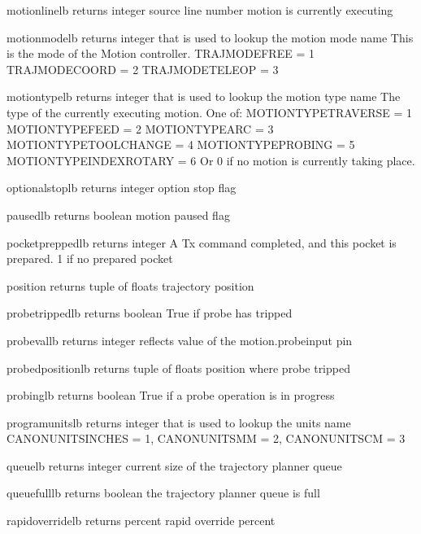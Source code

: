 \documentclass[letterpaper,10pt,english]{sphinxmanual}
\begin{document}
\begin{sphinxVerbatim}[commandchars=\\\{\}]
motion\PYGZus{}line\PYGZus{}lb \PYGZhy{} returns integer
source line number motion is currently executing

motion\PYGZus{}mode\PYGZus{}lb \PYGZhy{} returns integer that is used to lookup the motion mode name
This is the mode of the Motion controller.
        TRAJ\PYGZus{}MODE\PYGZus{}FREE = 1
        TRAJ\PYGZus{}MODE\PYGZus{}COORD = 2
        TRAJ\PYGZus{}MODE\PYGZus{}TELEOP = 3

motion\PYGZus{}type\PYGZus{}lb \PYGZhy{} returns integer that is used to lookup the motion type name
The type of the currently executing motion. One of:
        MOTION\PYGZus{}TYPE\PYGZus{}TRAVERSE = 1
        MOTION\PYGZus{}TYPE\PYGZus{}FEED = 2
        MOTION\PYGZus{}TYPE\PYGZus{}ARC = 3
        MOTION\PYGZus{}TYPE\PYGZus{}TOOLCHANGE = 4
        MOTION\PYGZus{}TYPE\PYGZus{}PROBING = 5
        MOTION\PYGZus{}TYPE\PYGZus{}INDEXROTARY = 6
        Or 0 if no motion is currently taking place.

optional\PYGZus{}stop\PYGZus{}lb \PYGZhy{} returns integer
option stop flag

paused\PYGZus{}lb \PYGZhy{} returns boolean
motion paused flag

pocket\PYGZus{}prepped\PYGZus{}lb \PYGZhy{} returns integer
A Tx command completed, and this pocket is prepared. \PYGZhy{}1 if no prepared pocket

position \PYGZhy{} returns tuple of floats
trajectory position

probe\PYGZus{}tripped\PYGZus{}lb \PYGZhy{} returns boolean
True if probe has tripped

probe\PYGZus{}val\PYGZus{}lb \PYGZhy{} returns integer
reflects value of the motion.probe\PYGZhy{}input pin

probed\PYGZus{}position\PYGZus{}lb \PYGZhy{} returns tuple of floats
position where probe tripped

probing\PYGZus{}lb \PYGZhy{} returns boolean
True if a probe operation is in progress

program\PYGZus{}units\PYGZus{}lb \PYGZhy{} returns integer that is used to lookup the units name
        CANON\PYGZus{}UNITS\PYGZus{}INCHES = 1,
        CANON\PYGZus{}UNITS\PYGZus{}MM = 2,
        CANON\PYGZus{}UNITS\PYGZus{}CM = 3

queue\PYGZus{}lb \PYGZhy{} returns integer
current size of the trajectory planner queue

queue\PYGZus{}full\PYGZus{}lb \PYGZhy{} returns boolean
the trajectory planner queue is full

rapid\PYGZus{}override\PYGZus{}lb \PYGZhy{} returns percent
rapid override percent


\end{sphinxVerbatim}
\end{document}
